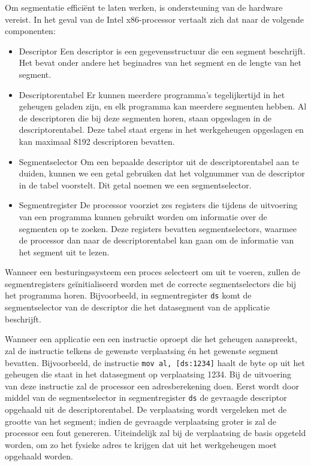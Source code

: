 
Om segmentatie effici\"ent te laten werken, is ondersteuning van de hardware
vereist. In het geval van de Intel x86-processor vertaalt zich dat naar de
volgende componenten:

\begin{itemize}
\item{Descriptor} Een descriptor is een gegevensstructuur die
een segment beschrijft. Het bevat onder andere het beginadres van het segment en
de lengte van het segment.
\item{Descriptorentabel} Er kunnen meerdere
programma's tegelijkertijd in het geheugen geladen zijn, en elk programma kan
meerdere segmenten hebben. Al de descriptoren die bij deze segmenten horen,
staan opgeslagen in de descriptorentabel. Deze tabel staat ergens in het
werkgeheugen opgeslagen en kan maximaal 8192 descriptoren bevatten.
\item{Segmentselector} Om een bepaalde descriptor uit de descriptorentabel aan
te duiden, kunnen we een getal gebruiken dat het volgnummer van de descriptor in
de tabel voorstelt. Dit getal noemen we een segmentselector.
\item{Segmentregister} De processor voorziet zes registers die tijdens de
uitvoering van een programma kunnen gebruikt worden om informatie over de
segmenten op te zoeken. Deze registers bevatten segmentselectors, waarmee de
processor dan naar de descriptorentabel kan gaan om de informatie van het
segment uit te lezen.
\end{itemize}

Wanneer een besturingssysteem een proces selecteert om uit te voeren, zullen de
segmentregisters ge\"initialiseerd worden met de correcte segmentselectors die
bij het programma horen. Bijvoorbeeld, in segmentregister \texttt{ds} komt de segmentselector
van de descriptor die het datasegment van de applicatie beschrijft.

Wanneer een applicatie een een instructie oproept die het geheugen aanspreekt, zal de instructie telkens de gewenste verplaatsing \'en het gewenste segment bevatten. Bijvoorbeeld, de instructie \texttt{mov al, [ds:1234]} haalt de byte op uit het geheugen die staat in het datasegment op verplaatsing 1234. Bij de uitvoering van deze instructie zal de processor een adresberekening doen. Eerst wordt door middel van de segmentselector in segmentregister \texttt{ds} de gevraagde descriptor opgehaald uit de descriptorentabel. De verplaatsing wordt vergeleken met de grootte van het segment; indien de gevraagde verplaatsing groter is zal de processor een fout genereren. Uiteindelijk zal bij de verplaatsing de basis opgeteld worden, om zo het fysieke adres te krijgen dat uit het werkgeheugen moet opgehaald worden.

